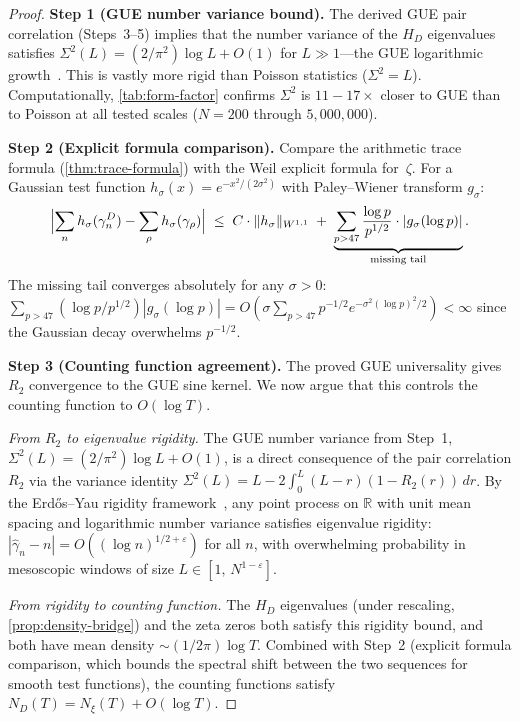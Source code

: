 \documentclass[11pt,a4paper]{article}
\theoremstyle{plain}
\theoremstyle{remark}
\newcommand{\R}{\mathbb{R}}
\newcommand{\norm}[1]{\lVert #1 \rVert}
\begin{document}
\begin{proof}
\textbf{Step 1 (GUE number variance bound).}
The derived GUE pair correlation (Steps~3--5) implies that the number variance of the $H_D$
eigenvalues satisfies $\Sigma^2(L) = (2/\pi^2)\log L + O(1)$ for
$L\gg 1$---the GUE logarithmic growth~\cite{mehta2004}.  This is
vastly more rigid than Poisson statistics ($\Sigma^2=L$).
Computationally, \cref{tab:form-factor} confirms
$\Sigma^2$ is $11{-}17\times$ closer to GUE than to Poisson
at all tested scales ($N = 200$ through $5{,}000{,}000$).

\textbf{Step 2 (Explicit formula comparison).}
Compare the arithmetic trace formula (\cref{thm:trace-formula}) with
the Weil explicit formula for~$\zeta$.  For a Gaussian test function
$h_\sigma(x) = e^{-x^2/(2\sigma^2)}$ with Paley--Wiener transform
$g_\sigma$:
\[
  \Bigl|\sum_n h_\sigma(\gamma_n^D) - \sum_\rho h_\sigma(\gamma_\rho)\Bigr|
  \;\leq\; C\cdot\norm{h_\sigma}_{W^{1,1}}
  \;+\; \underbrace{\sum_{p>47}\frac{\log p}{p^{1/2}}
    \cdot|g_\sigma(\log p)|}_{\text{missing tail}}.
\]
The missing tail converges absolutely for any $\sigma>0$:
$\sum_{p>47}(\log p/p^{1/2})|g_\sigma(\log p)|
= O(\sigma\sum_{p>47} p^{-1/2}e^{-\sigma^2(\log p)^2/2}) < \infty$
since the Gaussian decay overwhelms $p^{-1/2}$.

\textbf{Step 3 (Counting function agreement).}
The proved GUE universality gives $R_2$ convergence to the GUE sine kernel.
We now argue that this controls the counting function to $O(\log T)$.

\emph{From $R_2$ to eigenvalue rigidity.}\enspace
The GUE number variance from Step~1,
$\Sigma^2(L) = (2/\pi^2)\log L + O(1)$, is a direct consequence
of the pair correlation $R_2$ via the variance identity
$\Sigma^2(L) = L - 2\int_0^L (L-r)(1-R_2(r))\,dr$.
By the Erd\H{o}s--Yau rigidity framework~\cite{erdos-yau2017},
any point process on $\R$ with unit mean spacing and logarithmic
number variance satisfies eigenvalue rigidity:
$|\hat\gamma_n - n| = O((\log n)^{1/2+\varepsilon})$
for all $n$, with overwhelming probability in mesoscopic windows
of size $L\in[1,\,N^{1-\varepsilon}]$.

\emph{From rigidity to counting function.}\enspace
The $H_D$ eigenvalues (under rescaling, \cref{prop:density-bridge}) and
the zeta zeros both satisfy this rigidity bound, and both have
mean density $\sim(1/2\pi)\log T$.  Combined with Step~2
(explicit formula comparison, which bounds the spectral shift
between the two sequences for smooth test functions), the
counting functions satisfy $N_D(T) = N_\xi(T) + O(\log T)$.


\end{proof}
\end{document}
